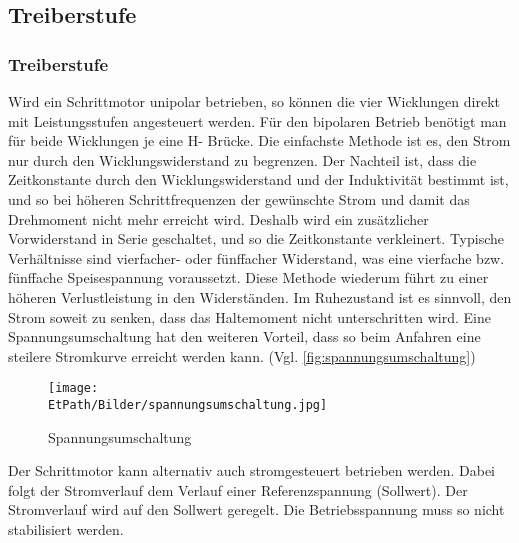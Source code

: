     \ifSTANDALONE
    \subsection{Treiberstufe}
    \fi
    \ifEMBED
    \subsubsection{Treiberstufe}
    \fi 
    	Wird ein Schrittmotor unipolar betrieben, so können die vier Wicklungen direkt mit Leistungsstufen angesteuert werden. Für den bipolaren Betrieb benötigt man für beide Wicklungen je eine H- Brücke. Die einfachste Methode ist es, den Strom nur durch den Wicklungswiderstand zu begrenzen. Der Nachteil ist, dass die Zeitkonstante durch den Wicklungswiderstand und der Induktivität bestimmt ist, und so bei höheren Schrittfrequenzen der gewünschte Strom und damit das Drehmoment nicht mehr erreicht wird. Deshalb wird ein zusätzlicher Vorwiderstand in Serie geschaltet, und so die Zeitkonstante verkleinert. Typische Verhältnisse sind vierfacher- oder fünffacher Widerstand, was eine vierfache bzw. fünffache Speisespannung voraussetzt. Diese Methode wiederum führt zu einer höheren Verlustleistung in den Widerständen. Im Ruhezustand ist es sinnvoll, den Strom soweit zu senken, dass das Haltemoment nicht unterschritten wird. Eine Spannungsumschaltung hat den weiteren Vorteil, dass so beim Anfahren eine steilere Stromkurve erreicht werden kann. (Vgl. \autoref{fig:spannungsumschaltung})
    	 \begin{figure}[h!]
    	 	\centering
    	 	\texttt{[image: \\EtPath/Bilder/spannungsumschaltung.jpg]}
    	 	\caption{Spannungsumschaltung}
    	 	\label{fig:spannungsumschaltung}
    	 \end{figure}
    	Der Schrittmotor kann alternativ auch stromgesteuert betrieben werden. Dabei folgt der Stromverlauf dem Verlauf einer Referenzspannung (Sollwert). Der Stromverlauf wird auf den Sollwert geregelt. Die Betriebsspannung muss so nicht stabilisiert werden. \label{stromgesteuert} 
	
	
		
